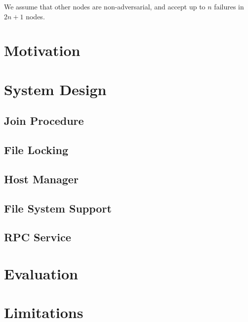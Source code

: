 \documentclass[preprint]{sig-alternate-10pt}
\begin{document}
We assume that other nodes are non-adversarial, and accept up to $n$ failures in $2n+1$ nodes.

\section{Motivation}
\label{sec:motivation}


\section{System Design}
\label{sec:designOverview}


%    

\subsection{Join Procedure}
\label{sec:joinProcedure}


\subsection{File Locking}
\label{sec:fileLocking}


\subsection{Host Manager}
\label{sec:hostManager}


\subsection{File System Support}
\label{sec:fsSupport}


\subsection{RPC Service}
\label{sec:rpcService}


\section{Evaluation}
\label{sec:evaluation}


\section{Limitations}
\label{sec:limitations}

\end{document}
